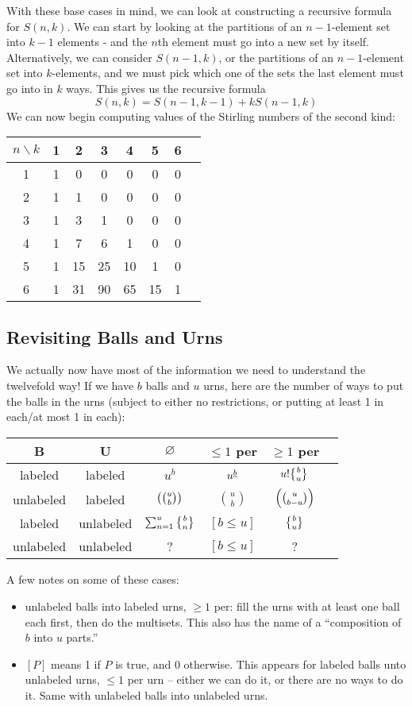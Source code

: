 With these base cases in mind, we can look at constructing a recursive formula for $S(n, k)$. We can start by looking at the partitions of an $n-1$-element set into $k-1$ elements - and the $n$th element must go into a new set by itself. Alternatively, we can consider $S(n-1, k)$, or the partitions of an $n-1$-element set into $k$-elements, and we must pick which one of the sets the last element must go into in $k$ ways. This gives us the recursive formula
\[
	S(n, k) = S(n-1, k-1) + kS(n-1, k)
\]
We can now begin computing values of the Stirling numbers of the second kind: 
\begin{center}
\begin{tabular}{c | c c c c c c c}
$n \backslash k$ & 1 & 2 & 3 & 4 & 5 & 6 \\ \hline 
1 & 1 & 0 & 0 & 0 & 0 & 0 \\
2 & 1 & 1 & 0 & 0 & 0 & 0 \\
3 & 1 & 3 & 1 & 0 & 0 & 0\\
4 & 1 & 7 & 6 & 1 & 0 & 0\\
5 & 1 & 15& 25& 10& 1 & 0\\
6 & 1 & 31& 90& 65& 15& 1\\
\end{tabular}
\end{center}

\subsection{Revisiting Balls and Urns}
We actually now have most of the information we need to understand the 
twelvefold way! If we have $b$ balls and $u$ urns, here are the number of ways 
to put the balls in the urns (subject to either no restrictions, or putting 
at least 1 in each/at most 1 in each):
\begin{center}
\begin{tabular}{c c c c c c}
B & U & $\varnothing$ & $\leq 1$ per & $\geq 1$ per \\ \hline 
labeled & labeled & $u^b$ & $u^{\underline{b}}$ & $u! \stirii{b}{u}$ \\
unlabeled & labeled & $\left(\binom{u}{b}\right)$ & $\binom u b$ & $\left(\binom{u}{b-u}\right)$ \\
labeled & unlabeled & $\sum_{n=1}^u \stirii b n$ & $[b \leq u]$ & $\stirii b u$ \\
unlabeled & unlabeled & ? & $[b \leq u]$ & ?  \\
\end{tabular}
\end{center}

A few notes on some of these cases: 
\begin{itemize}
    \item unlabeled balls into labeled urns, $\geq 1$ per: fill the urns with at 
    least one ball each first, then do the multisets. This also has the name of 
    a ``composition of $b$ into $u$ parts.''
    \item $[P]$ means 1 if $P$ is true, and 0 otherwise. This appears for 
    labeled balls unto unlabeled urns, $\leq 1$ per urn -- either we can 
    do it, or there are no ways to do it. Same with unlabeled balls into unlabeled urns. 
\end{itemize}
